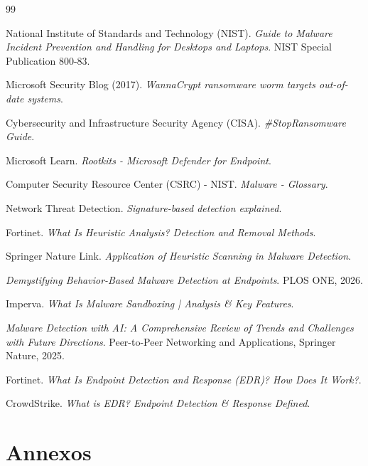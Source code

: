 \documentclass[12pt,a4paper]{report}
\begin{document}
\begin{thebibliography}{99}

National Institute of Standards and Technology (NIST).
\textit{Guide to Malware Incident Prevention and Handling for Desktops and Laptops}.
NIST Special Publication 800-83.

Microsoft Security Blog (2017).
\textit{WannaCrypt ransomware worm targets out-of-date systems}.

Cybersecurity and Infrastructure Security Agency (CISA).
\textit{\#StopRansomware Guide}.

Microsoft Learn.
\textit{Rootkits - Microsoft Defender for Endpoint}.

Computer Security Resource Center (CSRC) - NIST.
\textit{Malware - Glossary}.

Network Threat Detection.
\textit{Signature-based detection explained}.

Fortinet.
\textit{What Is Heuristic Analysis? Detection and Removal Methods}.

Springer Nature Link.
\textit{Application of Heuristic Scanning in Malware Detection}.

\textit{Demystifying Behavior-Based Malware Detection at Endpoints}.
PLOS ONE, 2026.

Imperva.
\textit{What Is Malware Sandboxing | Analysis \& Key Features}.

\textit{Malware Detection with AI: A Comprehensive Review of Trends and Challenges with Future Directions}.
Peer-to-Peer Networking and Applications, Springer Nature, 2025.

Fortinet.
\textit{What Is Endpoint Detection and Response (EDR)? How Does It Work?}.

CrowdStrike.
\textit{What is EDR? Endpoint Detection \& Response Defined}.

\end{thebibliography}


\appendix
\chapter{Annexos}
\label{ch:annexos}
\end{document}
